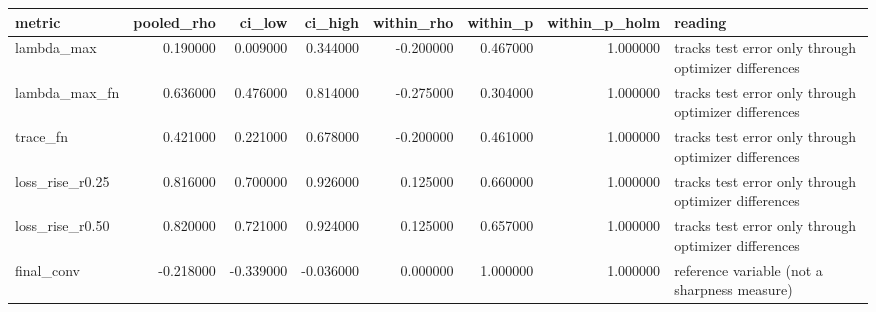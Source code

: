 \begin{tabular}{lrrrrrrl}
\toprule
metric & pooled\_rho & ci\_low & ci\_high & within\_rho & within\_p & within\_p\_holm & reading \\
\midrule
lambda\_max & 0.190000 & 0.009000 & 0.344000 & -0.200000 & 0.467000 & 1.000000 & tracks test error only through optimizer differences \\
lambda\_max\_fn & 0.636000 & 0.476000 & 0.814000 & -0.275000 & 0.304000 & 1.000000 & tracks test error only through optimizer differences \\
trace\_fn & 0.421000 & 0.221000 & 0.678000 & -0.200000 & 0.461000 & 1.000000 & tracks test error only through optimizer differences \\
loss\_rise\_r0.25 & 0.816000 & 0.700000 & 0.926000 & 0.125000 & 0.660000 & 1.000000 & tracks test error only through optimizer differences \\
loss\_rise\_r0.50 & 0.820000 & 0.721000 & 0.924000 & 0.125000 & 0.657000 & 1.000000 & tracks test error only through optimizer differences \\
final\_conv & -0.218000 & -0.339000 & -0.036000 & 0.000000 & 1.000000 & 1.000000 & reference variable (not a sharpness measure) \\
\bottomrule
\end{tabular}
